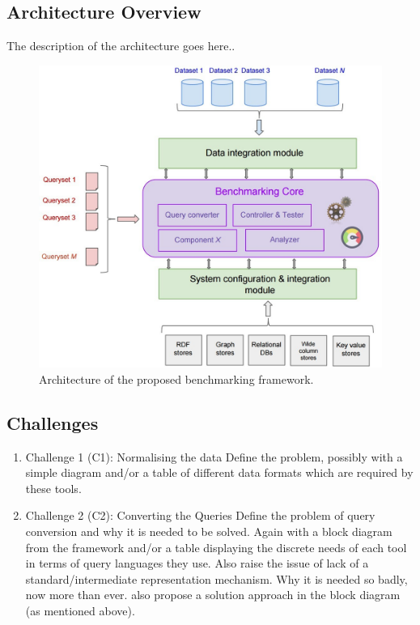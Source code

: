 \documentclass{llncs}
\begin{document}
    

    \subsection{Architecture Overview}
        The description of the architecture goes here.. 
        

        
        \begin{figure}[t]
            \centering
            \includegraphics[width=\textwidth]{images/benchmark_arch}
            \caption{Architecture of the proposed benchmarking framework.}
            \label{fig:benchmark_arch}
        \end{figure}
    
    \subsection{Challenges}
        \begin{enumerate}
            \item Challenge 1 (C1): Normalising the data
            Define the problem, possibly with a simple diagram and/or a table of different data formats which are required by these tools.
            \item Challenge 2 (C2): Converting the Queries
            Define the problem of query conversion and why it is needed to be solved. Again with a block diagram from the framework and/or a table displaying the discrete needs of each tool in terms of query languages they use.
            Also raise the issue of lack of a standard/intermediate representation mechanism. Why it is needed so badly, now more than ever.
            also propose a solution approach in the block diagram (as mentioned above).
        \end{enumerate}
        
\end{document}
